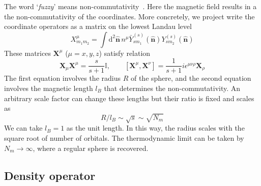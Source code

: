\documentclass{timesjhep}
\begin{document}
The word `\textit{fuzzy}' means non-commutativity~\cite{Madore1991Fuzzy}. Here the magnetic field results in a the non-commutativity of the coordinates. More concretely, we project write the coordinate operators as a matrix on the lowest Landau level 
\begin{equation}
    X^\mu_{m_1m_2}=\int\mathrm{d}^2\hat{\mathbf{n}}\,n^\mu \bar{Y}_{sm_1}^{(s)}(\hat{\mathbf{n}})Y_{sm_2}^{(s)}(\hat{\mathbf{n}})
\end{equation}
These matrices $\mathbf{X}^\mu$ ($\mu=x,y,z$) satisfy relation~\cite{Hasebe2010LLL,Zhou2023}
\begin{equation}
    \mathbf{X}_\mu\mathbf{X}^\mu=\frac{s}{s+1}\mathbb{I},\qquad [\mathbf{X}^\mu,\mathbf{X}^\nu]=\frac{1}{s+1}i\epsilon^{\mu\nu\rho}\mathbf{X}_\rho
\end{equation}
The first equation involves the radius $R$ of the sphere, and the second equation involves the magnetic length $l_B$ that determines the non-commutativity. An arbitrary scale factor can change these lengths but their ratio is fixed and scales as 
\begin{equation}
    R/l_B\sim\sqrt{s}\sim\sqrt{N_m}
\end{equation} 
We can take $l_B=1$ as the unit length. In this way, the radius scales with the square root of number of orbitals. The thermodynamic limit can be taken by $N_m\to\infty$, where a regular sphere is recovered. 

\subsection{Density operator}
\label{sec:construct_den}
\end{document}
